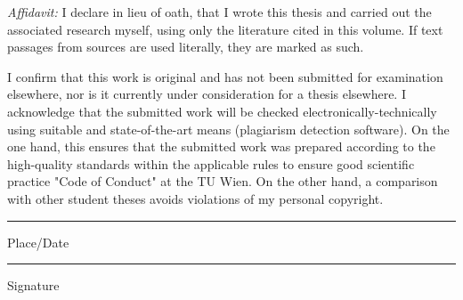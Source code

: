 \thispagestyle{plain}

\vfill

\textit{Affidavit:}\newline
I declare in lieu of oath, that I wrote this thesis and carried out the associated research myself, using only the literature cited in this volume. If text passages from sources are used literally, they are marked as such. \newline

I confirm that this work is original and has not been submitted for examination elsewhere, nor is it currently under consideration for a thesis elsewhere.
I acknowledge that the submitted work will be checked electronically-technically using suitable and state-of-the-art means (plagiarism detection software). On the one hand, this ensures that the submitted work was prepared according to the high-quality standards within the applicable rules to ensure good scientific practice "Code of Conduct" at the TU Wien. On the other hand, a comparison with other student theses avoids violations of my personal copyright.
\vspace{2cm}

\begin{minipage}{7cm}
  \centering
  \rule{7cm}{0.5pt}
  Place/Date
\end{minipage}\hfill
\begin{minipage}{7cm}
  \centering
  \rule{7cm}{0.5pt}
  Signature
\end{minipage}
\clearpage